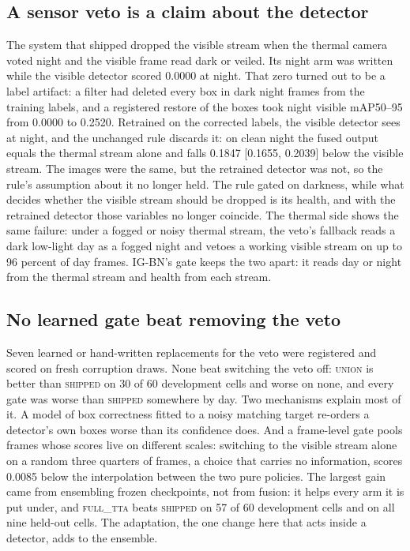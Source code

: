 \documentclass[10pt]{article}
\begin{document}
\subsection{A sensor veto is a claim about the detector}\label{sec:6.2}
The system that shipped dropped the visible stream when the thermal camera voted night and the visible frame read dark or veiled. Its night arm was written while the visible detector scored 0.0000 at night. That zero turned out to be a label artifact: a filter had deleted every box in dark night frames from the training labels, and a registered restore of the boxes took night visible mAP50--95 from 0.0000 to 0.2520. Retrained on the corrected labels, the visible detector sees at night, and the unchanged rule discards it: on clean night the fused output equals the thermal stream alone and falls 0.1847 [0.1655, 0.2039] below the visible stream. The images were the same, but the retrained detector was not, so the rule's assumption about it no longer held. The rule gated on darkness, while what decides whether the visible stream should be dropped is its health, and with the retrained detector those variables no longer coincide. The thermal side shows the same failure: under a fogged or noisy thermal stream, the veto's fallback reads a dark low-light day as a fogged night and vetoes a working visible stream on up to 96 percent of day frames. IG-BN's gate keeps the two apart: it reads day or night from the thermal stream and health from each stream.

\subsection{No learned gate beat removing the veto}\label{sec:6.3}
Seven learned or hand-written replacements for the veto were registered and scored on fresh corruption draws. None beat switching the veto off: \textsc{union} is better than \textsc{shipped} on 30 of 60 development cells and worse on none, and every gate was worse than \textsc{shipped} somewhere by day. Two mechanisms explain most of it. A model of box correctness fitted to a noisy matching target re-orders a detector's own boxes worse than its confidence does. And a frame-level gate pools frames whose scores live on different scales: switching to the visible stream alone on a random three quarters of frames, a choice that carries no information, scores 0.0085 below the interpolation between the two pure policies. The largest gain came from ensembling frozen checkpoints, not from fusion: it helps every arm it is put under, and \textsc{full\_tta} beats \textsc{shipped} on 57 of 60 development cells and on all nine held-out cells. The adaptation, the one change here that acts inside a detector, adds to the ensemble.
\end{document}
